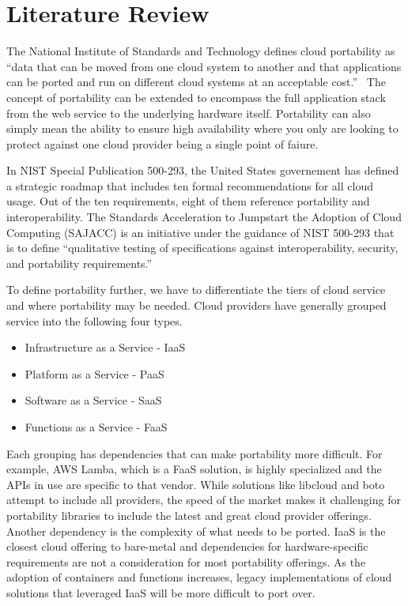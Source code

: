 \section{Literature Review}

The National Institute of Standards and Technology defines cloud  portability as ``data 
that can be moved from one cloud system to another and that  applications can be ported 
and run on different  cloud systems at an  acceptable cost.''~\cite{hid-sp18-518-NIST-291} 
The concept of portability can be extended to encompass the full application stack from
the web service to the underlying hardware itself. Portability can also simply mean the 
ability to ensure high availability where you only are looking to protect against one 
cloud provider being a single point of faiure.

In NIST Special Publication 500-293, the United States governement has defined a strategic
roadmap that includes ten formal recommendations for all cloud usage. Out of the ten 
requirements, eight of them reference portability and interoperability. The Standards 
Acceleration to Jumpstart the Adoption of Cloud Computing (SAJACC) is an initiative under
the guidance of NIST 500-293 that is to define ``qualitative testing of specifications 
against interoperability, security, and portability requirements.''~\cite{hid-sp18-518-NIS
T-293}

To define portability further, we have to differentiate the tiers of cloud service and 
where portability may be needed. Cloud providers have generally grouped service into the
following four types.

\begin{itemize}
\item
  Infrastructure as a Service - IaaS
\item
  Platform as a Service - PaaS
\item
  Software as a Service - SaaS
\item
  Functions as a Service - FaaS
\end{itemize}

Each grouping has dependencies that can make portability more difficult. For example, AWS
Lamba, which is a FaaS solution, is highly specialized and the APIs in use are specific to
that vendor. While solutions like libcloud and boto attempt to include all providers, the 
speed of the market makes it challenging for portability libraries to include the latest 
and great cloud provider offerings.~\cite{hid-sp18-518-LibCloud} Another dependency is 
the complexity of what needs to be ported. IaaS is the closest cloud offering to 
bare-metal and dependencies for hardware-specific requirements are not a consideration 
for most portability offerings. As the adoption of containers and functions increases, 
legacy implementations of cloud solutions that leveraged IaaS will be more difficult to 
port over. 


